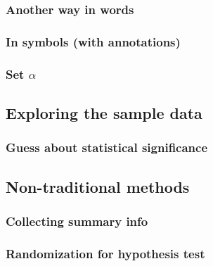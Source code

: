 \documentclass[12pt, krantz2,]{krantz}
\begin{document}
\hypertarget{another-way-in-words-1}{%
\subsubsection*{Another way in words}\label{another-way-in-words-1}}


\hypertarget{in-symbols-with-annotations-3}{%
\subsubsection*{In symbols (with annotations)}\label{in-symbols-with-annotations-3}}


\hypertarget{set-alpha-3}{%
\subsubsection*{\texorpdfstring{Set \(\alpha\)}{Set \textbackslash{}alpha}}\label{set-alpha-3}}


\hypertarget{exploring-the-sample-data-3}{%
\subsection{Exploring the sample data}\label{exploring-the-sample-data-3}}

\hypertarget{guess-about-statistical-significance-3}{%
\subsubsection*{Guess about statistical significance}\label{guess-about-statistical-significance-3}}


\hypertarget{non-traditional-methods-3}{%
\subsection{Non-traditional methods}\label{non-traditional-methods-3}}

\hypertarget{collecting-summary-info-1}{%
\subsubsection*{Collecting summary info}\label{collecting-summary-info-1}}


\hypertarget{randomization-for-hypothesis-test-1}{%
\subsubsection*{Randomization for hypothesis test}\label{randomization-for-hypothesis-test-1}}
\end{document}
